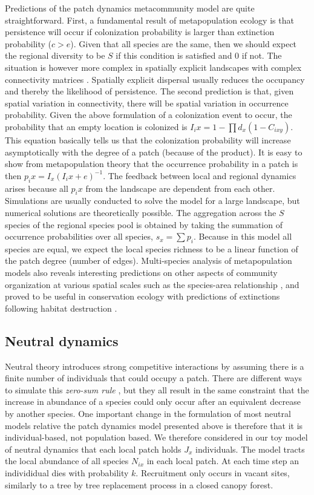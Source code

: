 \documentclass[12pt]{article}
\begin{document}
Predictions of the patch dynamics metacommunity model are quite straightforward.
First, a fundamental result of metapopulation ecology is that persistence will
occur if colonization probability is larger than extinction probability ($c>e$).
Given that all species are the same, then we should expect the regional
diversity to be $S$ if this condition is satisfied and $0$ if not. The situation
is however more complex in spatially explicit landscapes with complex
connectivity matrices \parencite{Hanski1998}. Spatially explicit dispersal
usually reduces the occupancy and thereby the likelihood of persistence. The
second prediction is that, given spatial variation in connectivity, there will
be spatial variation in occurrence probability. Given the above formulation of a
colonization event to occur, the probability that an empty location is colonized
is $I_ix=1-\prod d_x(1-C_{ixy})$. This equation basically tells us that the
colonization probability will increase asymptotically with the degree of a patch
(because of the product). It is easy to show from metapopulation theory that the
occurrence probability in a patch is then $p_ix=I_x(I_ix+e)^{-1}$. The feedback
between local and regional dynamics arises because all $p_ix$ from the landscape
are dependent from each other. Simulations are usually conducted to solve the
model for a large landscape, but numerical solutions are theoretically possible.
The aggregation across the $S$ species of the regional species pool is obtained
by taking the summation of occurrence probabilities over all species, $s_x =
\sum{p_i}$. Because in this model all species are equal, we expect the local
species richness to be a linear function of the patch degree (number of edges). Multi-species
analysis of metapopulation models also reveals interesting predictions on other
aspects of community organization at various spatial scales such as the species-area
relationship \parencite{Hanski1997}, and proved to be useful in conservation
ecology with predictions of extinctions following habitat destruction
\parencite{Nee1994,Rybicki2013}.

\subsection*{Neutral dynamics}

Neutral theory introduces strong competitive interactions by assuming there is a
finite number of individuals that could occupy a  patch. There are different
ways to simulate this \emph{zero-sum rule} \parencite{Bell2000,Hubbell2001}, but
they all result in the same constraint that the increase in abundance of a
species could only occur after an equivalent decrease by another species. One
important change in the formulation of most neutral models relative the patch
dynamics model presented above is therefore that it is individual-based, not
population based. We therefore considered in our toy model of neutral dynamics
that each local patch holds $J_x$ individuals. The model tracts the local
abundance of all species $N_{ix}$ in each local patch. At each time step an
individidual dies with probability $k$. Recruitment only occurs in vacant sites,
similarly to a tree by tree replacement process in a closed canopy forest. 
\end{document}
